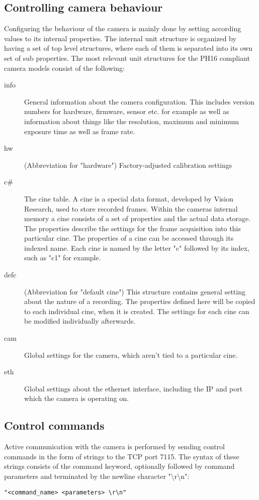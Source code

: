\subsection{Controlling camera behaviour}
Configuring the behaviour of the camera is mainly done by setting according values to its internal properties. The internal unit structure is organized by having a set of top level structures, where each of them is separated into its own set of sub properties. The most relevant unit structures for the PH16 compliant camera models consist of the following:

\begin{description}
\item[info] General information about the camera configuration. This includes version numbers for hardware, firmware, sensor etc. for example as well as information about things like the resolution, maximum and minimum exposure time as well as frame rate.
\item[hw] (Abbreviation for "hardware") Factory-adjusted calibration settings
\item[c\#] The cine table. A cine is a special data format, developed by Vision Research, used to store recorded frames. Within the cameras internal memory a cine consists of a set of properties and the actual data storage. The properties describe the settings for the frame acquisition into this particular cine. The properties of a cine can be accessed through its indexed name. Each cine is named by the letter "c" followed by its index, such as "c1" for example. 
\item[defc] (Abbreviation for "default cine") This structure contains general setting about the nature of a recording. The properties defined here will be copied to each individual cine, when it is created. The settings for each cine can be modified individually afterwards.
\item[cam] Global settings for the camera, which aren't tied to a particular cine.
\item[eth] Global settings about the ethernet interface, including the IP and port which the camera is operating on.
\end{description}

\subsection{Control commands}
Active communication with the camera is performed by sending control commands in the form of strings to the TCP port 7115. The syntax of these strings consists of the command keyword, optionally followed by command parameters and terminated by the newline character "\textbackslash r\textbackslash n":
\begin{lstlisting}
"<command_name> <parameters> \r\n"
\end{lstlisting}

